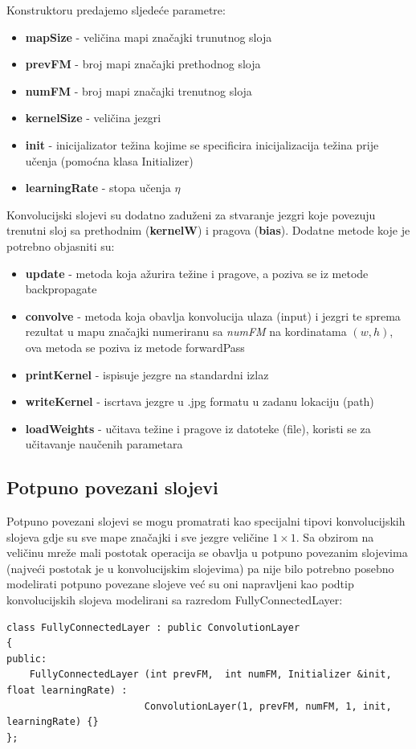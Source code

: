 \documentclass[times, utf8, zavrsni, numeric]{fer}
\begin{document}
Konstruktoru predajemo sljedeće parametre:
\begin{itemize}
\item \textbf{mapSize} - veličina mapi značajki trunutnog sloja
\item \textbf{prevFM} - broj mapi značajki prethodnog sloja
\item \textbf{numFM} - broj mapi značajki trenutnog sloja
\item \textbf{kernelSize} - veličina jezgri
\item \textbf{init} - inicijalizator težina kojime se specificira inicijalizacija težina prije učenja (pomoćna klasa Initializer)
\item \textbf{learningRate} - stopa učenja $\eta$
\end{itemize}

Konvolucijski slojevi su dodatno zaduženi za stvaranje jezgri koje povezuju trenutni sloj sa prethodnim (\textbf{kernelW}) i pragova (\textbf{bias}). Dodatne metode koje je potrebno objasniti su:
\begin{itemize}
\item \textbf{update} - metoda koja ažurira težine i pragove, a poziva se iz metode backpropagate
\item \textbf{convolve} - metoda koja obavlja konvolucija ulaza (input) i jezgri te sprema rezultat u mapu značajki numeriranu sa \textit{numFM} na kordinatama $(w, h)$, ova metoda se poziva iz metode forwardPass
\item \textbf{printKernel} - ispisuje jezgre na standardni izlaz
\item \textbf{writeKernel} - iscrtava jezgre u .jpg formatu u zadanu lokaciju (path)
\item \textbf{loadWeights} - učitava težine i pragove iz datoteke (file), koristi se za učitavanje naučenih parametara
\end{itemize}

\subsection{Potpuno povezani slojevi}
Potpuno povezani slojevi se mogu promatrati kao specijalni tipovi konvolucijskih slojeva gdje su sve mape značajki i sve jezgre veličine $1 \times 1$. Sa obzirom na veličinu mreže mali postotak operacija se obavlja u potpuno povezanim slojevima (najveći postotak je u konvolucijskim slojevima) pa nije bilo potrebno posebno modelirati potpuno povezane slojeve već su oni napravljeni kao podtip konvolucijskih slojeva modelirani sa razredom FullyConnectedLayer:
\begin{lstlisting}[caption=Razred FullyConnectedLayer,
  label=FullLayer]
class FullyConnectedLayer : public ConvolutionLayer
{
public:
    FullyConnectedLayer (int prevFM,  int numFM, Initializer &init, float learningRate) :
                        ConvolutionLayer(1, prevFM, numFM, 1, init, learningRate) {}
};
\end{lstlisting}
\end{document}
